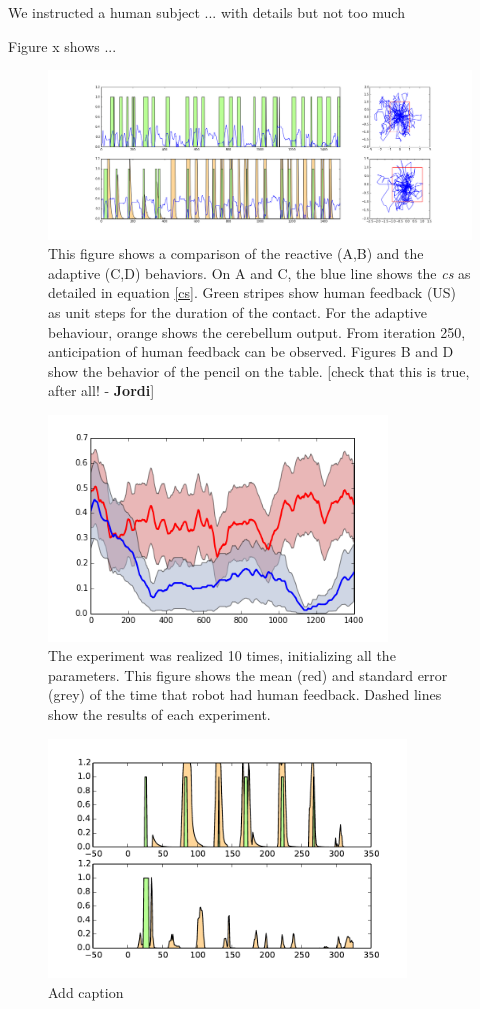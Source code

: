\documentclass[letterpaper, 10 pt, conference]{ieeeconf}  %
\newcommand\jp[1]{{\color{red}}{\color{red}}{\footnotesize \color{red}[#1 - \textbf{Jordi}]}} %
\begin{document}
We instructed a human subject ...
with details but not too much

Figure x shows ...


\begin{figure}[bc]
\centering
\includegraphics[width=20cm]{reactive_adaptive}
\caption{This figure shows a comparison of the reactive (A,B) and the adaptive (C,D) behaviors. On A and C, the blue line shows the \emph{cs} as detailed in equation \ref{cs}. Green stripes show human feedback (US) as unit steps for the duration of the contact. For the adaptive behaviour, orange shows the cerebellum output. From iteration 250, anticipation of human feedback can be observed. Figures B and D show the behavior of the pencil on the table. \jp{check that this is true, after all!}}
\label{fig:reactive}
\end{figure}



\begin{figure}
\centering
\includegraphics[width=9cm]{error}
\caption{The experiment was realized 10 times, initializing all the parameters. This figure shows the mean (red) and standard error (grey) of the time that robot had human feedback. Dashed lines show the results of each experiment. }
\label{fig:error}
\end{figure}

\begin{figure}
\centering
\includegraphics[width=9.5cm]{general}
\caption{Add caption}
\label{fig:general}
\end{figure}
\end{document}
